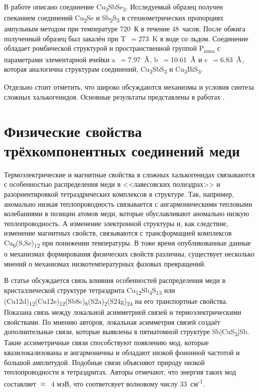В работе \cite{31_Whitfield_1980} описано соединение Cu\textsubscript{3}SbSe\textsubscript{3}. Исследуемый образец получен спеканием соединений Cu\textsubscript{2}Se и Sb\textsubscript{2}S\textsubscript{3} в стехиометрических пропорциях ампульным методом при температуре 720~К в течение 48~часов. После обжига полученный образец был закалён при T~$=$273~K в воде со льдом. Соединение обладает ромбической структурой и пространственной группой P\textsubscript{nma} с параметрами элементарной ячейки a~$=$7.97~$\mbox{\normalfont\AA}$, b~$=$10.61~$\mbox{\normalfont\AA}$ и c~$=$6.83~$\mbox{\normalfont\AA}$, которая аналогична структурам соединений,  Cu\textsubscript{3}SbS\textsubscript{3} и  Cu\textsubscript{3}BiS\textsubscript{3}.


Отдельно стоит отметить, что широко обсуждаются механизмы и условия синтеза сложных халькогенидов. Основные результаты представлены в работах \cite{Sis_Frost2002,sis_karup59new,sis_Mueller2002,sis_Mueller2003,sis_Raghavan2004,sis_seal1990tetrahedrite,sis_Skinner1972,sis_Taras_Bryndzia_1988,sis_Tomkins2006,sis1_1347-4065-8-4-443,sis1_BALAZ1995375,sis1_Braga2008,sis1_Pfitzner:se0205,sis1_WELLER2017794}.
\newpage


\section{Физические свойства трёхкомпонентных соединений меди} \label{sect1_3}

Термоэлектрические и магнитные свойства в сложных халькогенидах связываются с особенностью распределения меди в <<лавесовских полиэдрах>>  и разориентировкой тетраэдрических комплексов в структуре. Так, например, аномально низкая теплопроводность связывается с ангармоническими тепловыми колебаниями в позиции атомов меди\cite{Mishra2017}, которые обуславливают аномально низкую теплопроводность. А изменение электронной структуры и, как следствие, изменение магнитных свойств, связываются с трансформацией комплексов  Cu\textsubscript{6}(S,Se)\textsubscript{12} при понижении температуры\cite{Gainov2008}. В тоже время опубликованные данные о механизмах формирования физических свойств различны, существует несколько мнений о механизмах низкотемпературных фазовых превращений.


В статье \cite{Lai_2015} обсуждается связь влияния особенностей распределения меди в кристаллической структуре тетраэдрита Cu\textsubscript{12}Sb\textsubscript{4}S\textsubscript{13} или (Cu12d)\textsubscript{12}(Cu12e)\textsubscript{12}(Sb8c)\textsubscript{8}(S2a)\textsubscript{2}(S24g)\textsubscript{24} на его транспортные свойства. Показана связь между локальной асимметрией связей и термоэлектрическими свойствами.
По мнению авторов, локальная асимметрия связей создаёт дополнительные связи, которые выявлены в пятиатомной структуре Sb[CuS\textsubscript{3}]Sb. Такие ассиметричные связи способствуют появлению мод, которые квазилокализованы и ангармоничны и обладают низкой фононной частотой и большой амплитудой. Подобные связи объясняют природу низкой теплопроводности в тетраэдритах. Авторы отмечают, что энергия таких мод составляет $\approx$~4 мэВ, что соответсвует волновому числу 33~см\textsuperscript{-1}.

